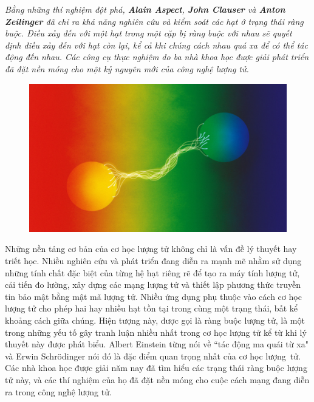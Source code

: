 \begin{multicols}{2}
	\textit{Bằng những thí nghiệm đột phá, \textbf{\color{timhieukhoahoc}Alain Aspect}, \textbf{\color{timhieukhoahoc}John Clauser} và \textbf{\color{timhieukhoahoc}Anton Zeilinger} đã chỉ ra khả năng nghiên cứu và kiểm soát các hạt ở trạng thái ràng buộc. Điều xảy đến với một hạt trong một cặp bị ràng buộc với nhau sẽ quyết định điều xảy đến với hạt còn lại, kể cả khi chúng cách nhau quá xa để có thể tác động đến nhau. Các công cụ thực nghiệm do ba nhà khoa học được giải phát triển đã đặt nền móng cho một kỷ nguyên mới của công nghệ lượng tử.}
	\begin{figure}[H]
		\vspace*{-5pt}
		\centering
		\captionsetup{labelformat= empty, justification=centering}
		\includegraphics[width= 1\linewidth]{7}
		\vspace*{-20pt}
	\end{figure}
	Những nền tảng cơ bản của cơ học lượng tử không chỉ là vấn đề lý thuyết hay triết học. Nhiều nghiên cứu và phát triển đang diễn ra mạnh mẽ nhằm sử dụng những tính chất đặc biệt của từng hệ hạt riêng rẽ để tạo ra máy tính lượng tử, cải tiến đo lường, xây dựng các mạng lượng tử và thiết lập phương thức truyền tin bảo mật bằng mật mã lượng tử.
	\vskip 0.1cm
	Nhiều ứng dụng phụ thuộc vào cách cơ học lượng tử cho phép hai hay nhiều hạt tồn tại trong cùng một trạng thái, bất kể khoảng cách giữa chúng. Hiện tượng này, được gọi là ràng buộc lượng tử, là một trong những yếu tố gây tranh luận nhiều nhất trong cơ học lượng tử kể từ khi lý thuyết này được phát biểu. Albert Einstein từng nói về ``tác động ma quái từ xa" và Erwin Schrödinger nói đó là đặc điểm quan trọng nhất của cơ học lượng~tử.
	\vskip 0.1cm
	Các nhà khoa học được giải năm nay đã tìm hiểu các trạng thái ràng buộc lượng tử này, và các thí nghiệm của họ đã đặt nền móng cho cuộc cách mạng đang diễn ra trong công nghệ lượng tử.

\end{multicols}
